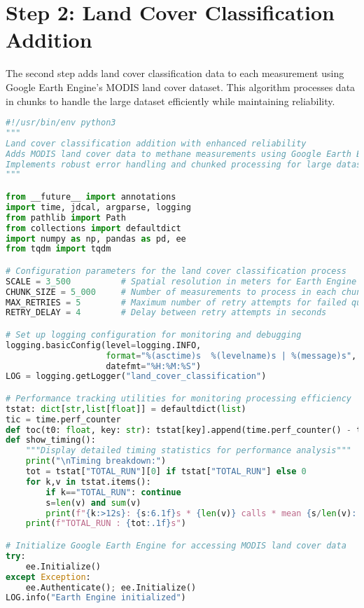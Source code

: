 \section{Step 2: Land Cover Classification Addition}
\label{sec:appendixB_step2}

The second step adds land cover classification data to each measurement using Google Earth Engine's MODIS land cover dataset. This algorithm processes data in chunks to handle the large dataset efficiently while maintaining reliability.

\begin{lstlisting}[language=Python, caption=Land Cover Classification Addition Algorithm, label=alg:step02_add_lc]
#!/usr/bin/env python3
"""
Land cover classification addition with enhanced reliability
Adds MODIS land cover data to methane measurements using Google Earth Engine.
Implements robust error handling and chunked processing for large datasets.
"""

from __future__ import annotations
import time, jdcal, argparse, logging
from pathlib import Path
from collections import defaultdict
import numpy as np, pandas as pd, ee
from tqdm import tqdm

# Configuration parameters for the land cover classification process
SCALE = 3_500          # Spatial resolution in meters for Earth Engine queries
CHUNK_SIZE = 5_000     # Number of measurements to process in each chunk
MAX_RETRIES = 5        # Maximum number of retry attempts for failed queries
RETRY_DELAY = 4        # Delay between retry attempts in seconds

# Set up logging configuration for monitoring and debugging
logging.basicConfig(level=logging.INFO,
                    format="%(asctime)s  %(levelname)s | %(message)s",
                    datefmt="%H:%M:%S")
LOG = logging.getLogger("land_cover_classification")

# Performance tracking utilities for monitoring processing efficiency
tstat: dict[str,list[float]] = defaultdict(list)
tic = time.perf_counter
def toc(t0: float, key: str): tstat[key].append(time.perf_counter() - t0)
def show_timing():
    """Display detailed timing statistics for performance analysis"""
    print("\nTiming breakdown:")
    tot = tstat["TOTAL_RUN"][0] if tstat["TOTAL_RUN"] else 0
    for k,v in tstat.items():
        if k=="TOTAL_RUN": continue
        s=len(v) and sum(v)
        print(f"{k:>12s}: {s:6.1f}s * {len(v)} calls * mean {s/len(v):.3f}s")
    print(f"TOTAL_RUN : {tot:.1f}s")

# Initialize Google Earth Engine for accessing MODIS land cover data
try: 
    ee.Initialize()
except Exception:
    ee.Authenticate(); ee.Initialize()
LOG.info("Earth Engine initialized")


\end{lstlisting}

